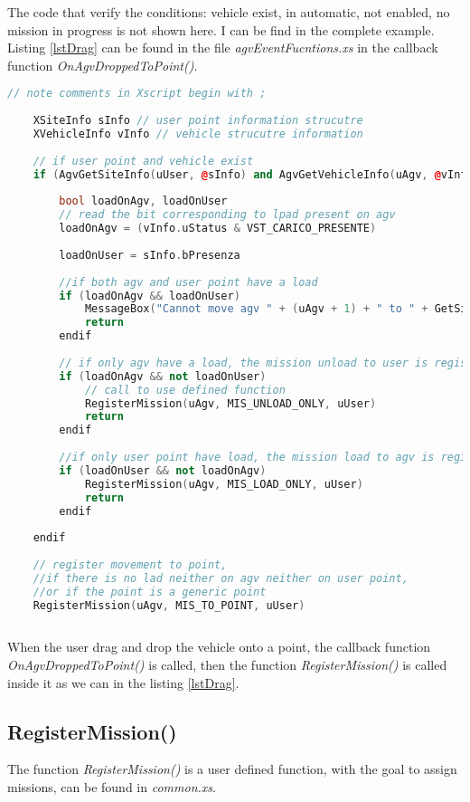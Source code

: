 The code that verify the conditions: vehicle exist, in automatic, not enabled, no mission in progress is not shown here. I can be find in the complete example.\\

Listing \ref{lstDrag} can be found in the file \textit{agvEventFucntions.xs} in the callback function \textit{OnAgvDroppedToPoint()}.

\begin{lstlisting}[language=c++, caption= Drag and drop to user point and generic point, label=lstDrag]
	// note comments in Xscript begin with ;
	
	XSiteInfo sInfo // user point information strucutre
	XVehicleInfo vInfo // vehicle strucutre information
	
	// if user point and vehicle exist
	if (AgvGetSiteInfo(uUser, @sInfo) and AgvGetVehicleInfo(uAgv, @vInfo))
	
		bool loadOnAgv, loadOnUser
		// read the bit corresponding to lpad present on agv
		loadOnAgv = (vInfo.uStatus & VST_CARICO_PRESENTE)
		
		loadOnUser = sInfo.bPresenza
		
		//if both agv and user point have a load
		if (loadOnAgv && loadOnUser)
			MessageBox("Cannot move agv " + (uAgv + 1) + " to " + GetSiteName(uUser) + " : both have a trolley")
			return
		endif
		
		// if only agv have a load, the mission unload to user is registered
		if (loadOnAgv && not loadOnUser)
			// call to use defined function
			RegisterMission(uAgv, MIS_UNLOAD_ONLY, uUser)
			return
		endif
		
		//if only user point have load, the mission load to agv is registerd.
		if (loadOnUser && not loadOnAgv)
			RegisterMission(uAgv, MIS_LOAD_ONLY, uUser)
			return
		endif
		
	endif
	
	// register movement to point, 
	//if there is no lad neither on agv neither on user point, 
	//or if the point is a generic point
	RegisterMission(uAgv, MIS_TO_POINT, uUser)
	
\end{lstlisting}

When the user drag and drop the vehicle onto a point, the callback function \textit{OnAgvDroppedToPoint()} is called, then the function \textit{RegisterMission()} is called inside it as we can in the listing \ref{lstDrag}.

\subsection*{RegisterMission()}
The function \textit{RegisterMission()} is a user defined function, with the goal to assign missions, can be found in \textit{common.xs}.

